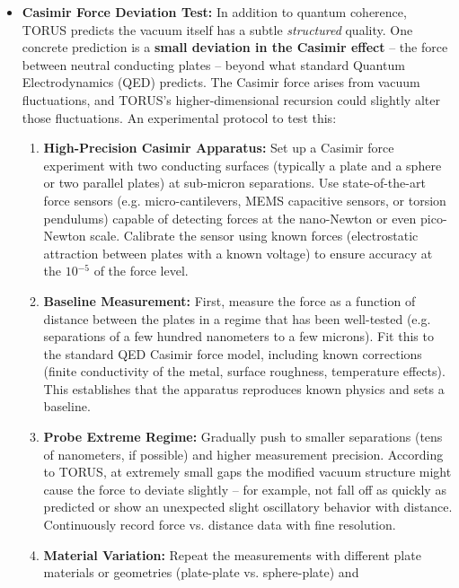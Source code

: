 \documentclass[]{article}
\newcommand{\superscript}[1]{\ensuremath{^{\mathrm{#1}}}}
\begin{document}
\begin{itemize}
\item
  \textbf{Casimir Force Deviation Test:} In addition to quantum
  coherence, TORUS predicts the vacuum itself has a subtle
  \emph{structured} quality. One concrete prediction is a \textbf{small
  deviation in the Casimir effect} -- the force between neutral
  conducting plates -- beyond what standard Quantum Electrodynamics
  (QED) predicts. The Casimir force arises from vacuum fluctuations, and
  TORUS's higher-dimensional recursion could slightly alter those
  fluctuations. An experimental protocol to test this:

  \begin{enumerate}
  \def\labelenumi{\alph{enumi}.}
  \item
    \textbf{High-Precision Casimir Apparatus:} Set up a Casimir force
    experiment with two conducting surfaces (typically a plate and a
    sphere or two parallel plates) at sub-micron separations. Use
    state-of-the-art force sensors (e.g. micro-cantilevers, MEMS
    capacitive sensors, or torsion pendulums) capable of detecting
    forces at the nano-Newton or even pico-Newton scale. Calibrate the
    sensor using known forces (electrostatic attraction between plates
    with a known voltage) to ensure accuracy at the $10\superscript{−5}$ of
    the force level.
  \item
    \textbf{Baseline Measurement:} First, measure the force as a
    function of distance between the plates in a regime that has been
    well-tested (e.g. separations of a few hundred nanometers to a few
    microns). Fit this to the standard QED Casimir force model,
    including known corrections (finite conductivity of the metal,
    surface roughness, temperature effects). This establishes that the
    apparatus reproduces known physics and sets a baseline.
  \item
    \textbf{Probe Extreme Regime:} Gradually push to smaller separations
    (tens of nanometers, if possible) and higher measurement precision.
    According to TORUS, at extremely small gaps the modified vacuum
    structure might cause the force to deviate slightly -- for example,
    not fall off as quickly as predicted or show an unexpected slight
    oscillatory behavior with distance​. Continuously record force vs.
    distance data with fine resolution.
  \item
    \textbf{Material Variation:} Repeat the measurements with different
    plate materials or geometries (plate-plate vs. sphere-plate) and

\end{enumerate}
\end{itemize}
\end{document}
